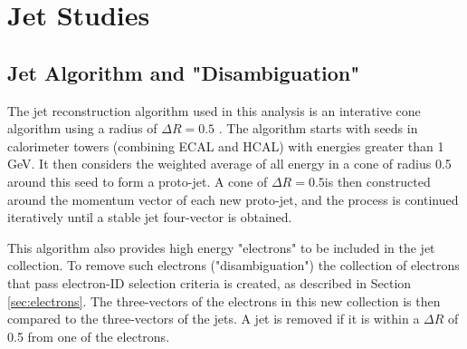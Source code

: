%
\section{Jet Studies} \label{sec:jet}

\subsection{Jet Algorithm and "Disambiguation"}

The jet reconstruction algorithm used in this analysis is an interative cone algorithm using a radius of $\Delta R=0.5$ \cite{JetAlg}.  
The algorithm starts with seeds in calorimeter towers (combining ECAL and HCAL) with energies greater than 
1 GeV. It then considers the weighted average of all energy in a cone of radius 0.5 around this seed to form a proto-jet.  
A cone of $\Delta R = 0.5$is then constructed around the momentum vector of each new proto-jet,  
and the process is continued iteratively until a stable jet four-vector is obtained.


This algorithm also provides high energy "electrons" to be included in the jet collection. 
To remove such electrons ("disambiguation") the collection of electrons that pass electron-ID selection criteria is created, 
as described in Section \ref{sec:electrons}.  The three-vectors of the 
 electrons in this new collection is then compared to the three-vectors of the jets. 
A jet is removed if it is within a $\Delta R$ of 0.5 from one of the electrons. 


